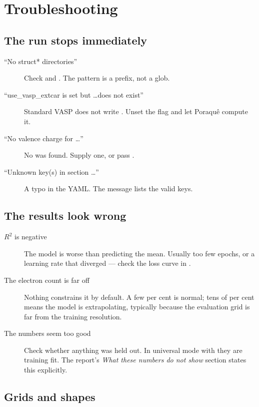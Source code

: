 \chapter{Troubleshooting}
\label{ch:troubleshooting}

\section{The run stops immediately}

\begin{description}
  \item[``No struct* directories''] Check  and
    . The pattern is a prefix, not a glob.
  \item[``use\_vasp\_extcar is set but \ldots does not exist''] Standard VASP
    does not write . Unset the flag and let Poraqu\^e compute it.
  \item[``No valence charge for \ldots''] No  was found. Supply one,
    or pass .
  \item[``Unknown key(s) in section \ldots''] A typo in the YAML. The message
    lists the valid keys.
\end{description}

\section{The results look wrong}

\begin{description}
  \item[$R^2$ is negative] The model is worse than predicting the mean. Usually
    too few epochs, or a learning rate that diverged --- check the loss curve in
    .
  \item[The electron count is far off] Nothing constrains it by default. A few
    per cent is normal; tens of per cent means the model is extrapolating,
    typically because the evaluation grid is far from the training resolution.
  \item[The numbers seem too good] Check whether anything was held out. In
    universal mode with  they are training fit. The report's
    \emph{What these numbers do not show} section states this explicitly.
\end{description}

\section{Grids and shapes}

